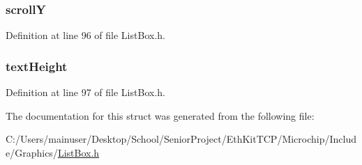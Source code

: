 \subsubsection[{scroll\+Y}]{ scroll\+Y}\label{struct_l_i_s_t_b_o_x_a3e7072db2665be3ccc135ea06961b93e}


Definition at line 96 of file List\+Box.\+h.

\hypertarget{struct_l_i_s_t_b_o_x_a40fa9c35391b0005032180b85e7afd34}{}
\subsubsection[{text\+Height}]{ text\+Height}\label{struct_l_i_s_t_b_o_x_a40fa9c35391b0005032180b85e7afd34}


Definition at line 97 of file List\+Box.\+h.



The documentation for this struct was generated from the following file\+:\begin{DoxyCompactItemize}
\item 
C\+:/\+Users/mainuser/\+Desktop/\+School/\+Senior\+Project/\+Eth\+Kit\+T\+C\+P/\+Microchip/\+Include/\+Graphics/\hyperlink{_list_box_8h}{List\+Box.\+h}\end{DoxyCompactItemize}
